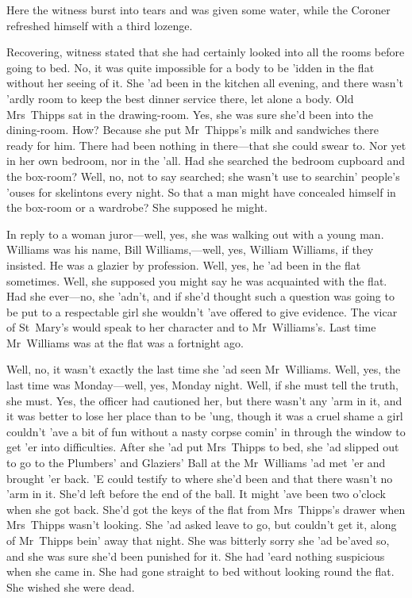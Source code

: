 Here the witness burst into tears and was given some water, while the Coroner refreshed himself with a third lozenge.

Recovering, witness stated that she had certainly looked into all the rooms before going to bed. No, it was quite impossible for a body to be 'idden in the flat without her seeing of it. She 'ad been in the kitchen all evening, and there wasn't 'ardly room to keep the best dinner service there, let alone a body. Old Mrs~Thipps sat in the drawing-room. Yes, she was sure she'd been into the dining-room. How? Because she put Mr~Thipps's milk and sandwiches there ready for him. There had been nothing in there—that she could swear to. Nor yet in her own bedroom, nor in the 'all. Had she searched the bedroom cupboard and the box-room? Well, no, not to say searched; she wasn't use to searchin' people's 'ouses for skelintons every night. So that a man might have concealed himself in the box-room or a wardrobe? She supposed he might.

In reply to a woman juror—well, yes, she was walking out with a young man. Williams was his name, Bill Williams,—well, yes, William Williams, if they insisted. He was a glazier by profession. Well, yes, he 'ad been in the flat sometimes. Well, she supposed you might say he was acquainted with the flat. Had she ever—no, she 'adn't, and if she'd thought such a question was going to be put to a respectable girl she wouldn't 'ave offered to give evidence. The vicar of St~Mary's would speak to her character and to Mr~Williams's. Last time Mr~Williams was at the flat was a fortnight ago.

Well, no, it wasn't exactly the last time she 'ad seen Mr~Williams. Well, yes, the last time was Monday—well, yes, Monday night. Well, if she must tell the truth, she must. Yes, the officer had cautioned her, but there wasn't any 'arm in it, and it was better to lose her place than to be 'ung, though it was a cruel shame a girl couldn't 'ave a bit of fun without a nasty corpse comin' in through the window to get 'er into difficulties. After she 'ad put Mrs~Thipps to bed, she 'ad slipped out to go to the Plumbers' and Glaziers' Ball at the  Mr~Williams 'ad met 'er and brought 'er back. 'E could testify to where she'd been and that there wasn't no 'arm in it. She'd left before the end of the ball. It might 'ave been two o'clock when she got back. She'd got the keys of the flat from Mrs~Thipps's drawer when Mrs~Thipps wasn't looking. She 'ad asked leave to go, but couldn't get it, along of Mr~Thipps bein' away that night. She was bitterly sorry she 'ad be'aved so, and she was sure she'd been punished for it. She had 'eard nothing suspicious when she came in. She had gone straight to bed without looking round the flat. She wished she were dead.

